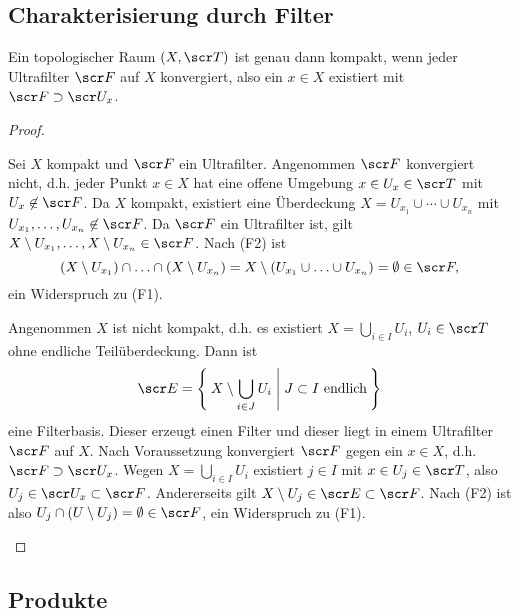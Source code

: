 \subsection{Charakterisierung durch Filter}

\begin{st}
	Ein topologischer Raum $(X, \scr T)$ ist genau dann kompakt, wenn jeder Ultrafilter $\scr F$ auf $X$ konvergiert, also ein $x \in X$ existiert mit $\scr F \supset \scr U_x$.
	\begin{proof}
		\begin{segnb}[„$\implies$“]
			Sei $X$ kompakt und $\scr F$ ein Ultrafilter.
			Angenommen $\scr F$ konvergiert nicht, d.h. jeder Punkt $x \in X$ hat eine offene Umgebung $x \in U_x \in \scr T$ mit $U_x \not\in \scr F$.
			Da $X$ kompakt, existiert eine Überdeckung $X = U_{x_1} \cup \dotsb \cup U_{x_n}$ mit $U_{x_1}, \dotsc, U_{x_n} \not\in \scr F$.
			Da $\scr F$ ein Ultrafilter ist, gilt $X \setminus U_{x_1}, \dotsc, X \setminus U_{x_n} \in \scr F$.
			Nach (F2) ist
			\[
				(X \setminus U_{x_1}) \cap \dotsc \cap (X \setminus U_{x_n})
				= X \setminus (U_{x_1} \cup \dotsc \cup U_{x_n})
				= \emptyset \in \scr F,
			\]
			ein Widerspruch zu (F1).
		\end{segnb}
		\begin{segnb}[„$\impliedby$“]
			Angenommen $X$ ist nicht kompakt, d.h. es existiert $X = \bigcup_{i\in I} U_i$, $U_i \in \scr T$ ohne endliche Teilüberdeckung.
			Dann ist
			\[
				\scr E
				= \Set{ X \setminus \bigcup_{i\in J} U_i | J \subset I \text{ endlich} }
			\]
			eine Filterbasis.
			Dieser erzeugt einen Filter und dieser liegt in einem Ultrafilter $\scr F$ auf $X$.
			Nach Voraussetzung konvergiert $\scr F$ gegen ein $x \in X$, d.h. $\scr F \supset \scr U_x$.
			Wegen $X = \bigcup_{i\in I} U_i$ existiert $j \in I$ mit $x \in U_j \in \scr T$, also $U_j \in \scr U_x \subset \scr F$.
			Andererseits gilt $X \setminus U_j \in \scr E \subset \scr F$.
			Nach (F2) ist also $U_j \cap (U \setminus U_j) = \emptyset \in \scr F$, ein Widerspruch zu (F1).
		\end{segnb}
	\end{proof}
\end{st}

\subsection{Produkte}

